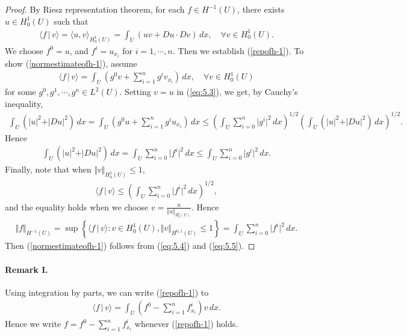 \documentclass{article}
\numberwithin{equation}{section}
\theoremstyle{plain}
\theoremstyle{definition}
\begin{document}
\begin{proof}
By Riesz representation theorem, for each $f\in H^{-1}(U)$, there exists $u\in H_0^1(U)$ such that
\begin{align}
	\langle f\,|\,v\rangle = \langle u,v\rangle_{H_0^1(U)}=\int_U(uv+Du\cdot Dv)\,dx,\quad\forall v\in H_0^1(U).\label{eq:5.3}
\end{align}
We choose $f^0=u$, and $f^i=u_{x_i}$ for $i=1,\cdots,n$. Then we establish (\ref{repofh-1}). To show (\ref{normestimateofh-1}), assume
\begin{align*}
	\langle f\,|\,v\rangle=\int_U\left(g^0v+\sum_{i=1}^n g^i v_{x_i}\right)\,dx,\quad\forall v\in H_0^1(U)
\end{align*}
for some $g^0,g^1,\cdots,g^n\in L^2(U)$. Setting $v=u$ in (\ref{eq:5.3}), we get, by Cauchy's inequality,
\begin{align*}
	\int_U(\vert u\vert^2+\vert Du\vert^2)\,dx=\int_U\left(g^0u+\sum_{i=1}^n g^i u_{x_i}\right)\,dx\leq\left(\int_U\sum_{i=0}^n\vert g^i\vert^2\,dx\right)^{1/2}\left(\int_U(\vert u\vert^2+\vert Du\vert^2)\,dx\right)^{1/2}.
\end{align*}
Hence
\begin{align}
	\int_U(\vert u\vert^2+\vert Du\vert^2)\,dx=\int_U\sum_{i=0}^n\vert f^i\vert^2\,dx\leq\int_U\sum_{i=0}^n\vert g^i\vert^2\,dx.\label{eq:5.4}
\end{align}
Finally, note that when $\Vert v\Vert_{H_0^1(U)}\leq 1$,
\begin{align*}
	\langle f\,|\,v\rangle\leq\left(\int_U\sum_{i=0}^n\vert f^i\vert^2\,dx\right)^{1/2},
\end{align*}
and the equality holds when we choose $v=\frac{u}{\Vert u\Vert_{H_0^1(U)}}$. Hence
\begin{align}
	\Vert f\Vert_{H^{-1}(U)}=\sup\left\{\langle f\,|\,v\rangle:v\in H_0^1(U),\Vert v\Vert_{H^{0,1}(U)}\leq 1\right\}=\int_U\sum_{i=0}^n\vert f^i\vert^2\,dx.\label{eq:5.5}
\end{align}
Then (\ref{normestimateofh-1}) follows from (\ref{eq:5.4}) and (\ref{eq:5.5}).
\end{proof}

\paragraph{Remark I.} Using integration by parts, we can write (\ref{repofh-1}) to
\begin{align*}
	\langle f\,|\,v\rangle=\int_U\left(f^0-\sum_{i=1}^n f^i_{x_i}\right)v\,dx.
\end{align*}
Hence we write $f=f^0-\sum_{i=1}^n f^i_{x_i}$ whenever (\ref{repofh-1}) holds. 
\end{document}
